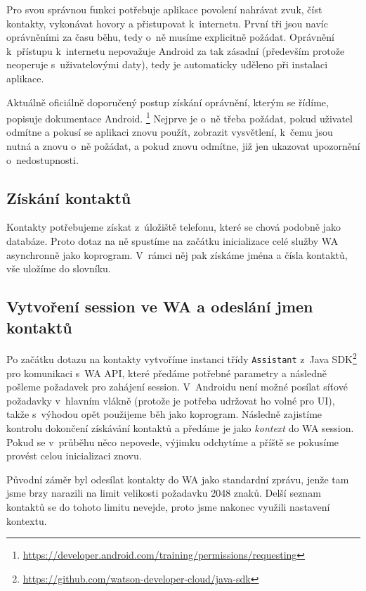 Pro svou správnou funkci potřebuje aplikace povolení nahrávat zvuk, číst
kontakty, vykonávat hovory a přistupovat k~internetu. První
tři jsou navíc oprávněními za času běhu, tedy o~ně musíme explicitně
požádat. Oprávnění k~přístupu k~internetu nepovažuje Android za tak zásadní (především
protože neoperuje s~uživatelovými daty), tedy je automaticky
uděleno při instalaci aplikace.

Aktuálně oficiálně doporučený postup získání oprávnění, kterým se řídíme, popisuje
dokumentace Android.%
\footnote{\url{https://developer.android.com/training/permissions/requesting}}
Nejprve je o~ně třeba
požádat, pokud uživatel odmítne a pokusí se
aplikaci znovu použít, zobrazit vysvětlení, k~čemu jsou nutná a znovu o~ně
požádat, a pokud znovu odmítne, již jen ukazovat upozornění o~nedostupnosti.

\subsection{Získání kontaktů}\label{get-contacts}

Kontakty potřebujeme získat z~úložiště telefonu, které se chová podobně jako
databáze. Proto dotaz na ně spustíme na začátku inicializace celé služby WA
asynchronně jako koprogram. V~rámci něj pak získáme jména a čísla kontaktů,
vše uložíme do slovníku.

\subsection{Vytvoření session ve WA a odeslání jmen kontaktů}\label{create-session}

Po začátku dotazu na kontakty vytvoříme instanci třídy \texttt{Assistant}
z~Java SDK\footnote{\url{https://github.com/watson-developer-cloud/java-sdk}}
pro komunikaci s~WA API, které předáme potřebné parametry a následně pošleme
požadavek pro zahájení session. V~Androidu není možné posílat síťové požadavky
v~hlavním vlákně (protože je potřeba udržovat ho volné pro UI), takže s~výhodou
opět použijeme běh jako koprogram. Následně zajistíme
kontrolu dokončení získávání kontaktů a předáme je jako \textit{kontext} do
WA session. Pokud se v~průběhu něco nepovede, výjimku odchytíme a příště
se pokusíme provést celou inicializaci znovu.

Původní záměr byl odesílat kontakty do WA jako standardní zprávu, jenže
tam jsme brzy narazili na limit velikosti požadavku 2048 znaků. Delší
seznam kontaktů se do tohoto limitu nevejde, proto jsme nakonec využili
nastavení kontextu.

